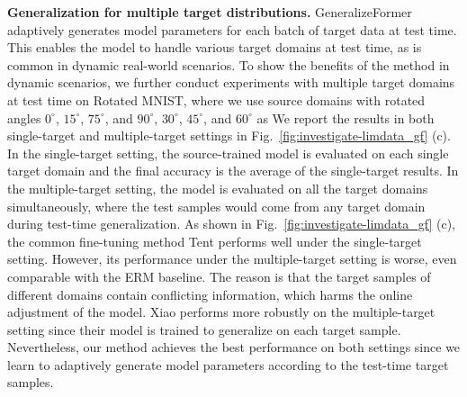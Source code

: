\noindent
\textbf{Generalization for multiple target distributions.}
GeneralizeFormer adaptively generates model parameters for each batch of target data at test time. 
This enables the model to handle various target domains at test time, as is common in dynamic real-world scenarios. To show the benefits of the method in dynamic scenarios, we further conduct experiments with multiple target domains at test time on Rotated MNIST, where we use source domains with rotated angles $0^\circ$, $15^\circ$, $75^\circ$, and $90^\circ$, $30^\circ$, $45^\circ$, and $60^\circ$ as  
We report the results in both single-target and multiple-target settings in Fig.~\ref{fig:investigate-limdata_gf} (c).
In the single-target setting, the source-trained model is evaluated on each single target domain and the final accuracy is the average of the single-target results. 
In the multiple-target setting, the model is evaluated on all the target domains simultaneously, where the test samples would come from any target domain during test-time generalization.
As shown in Fig.~\ref{fig:investigate-limdata_gf} (c), the common fine-tuning method Tent performs well under the single-target setting. However, its performance under the multiple-target setting is worse, even comparable with the ERM baseline.
The reason is that the target samples of different domains contain conflicting information, which harms the online adjustment of the model.
Xiao \etal \cite{xiao2022learning} performs more robustly on the multiple-target setting since their model is trained to generalize on each target sample.
Nevertheless, our method achieves the best performance on both settings since we learn to adaptively generate model parameters according to the test-time target samples.









 
 










 









 


















